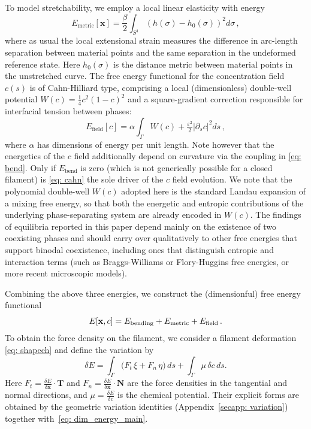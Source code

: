 \documentclass[
aip,
jcp,
reprint, 
floatfix
]{revtex4-1}
\begin{document}
To model stretchability, we employ a local linear elasticity with energy
\begin{equation} \label{eq: E_metric}
E_{\mathrm{metric}}[\mathbf{x}]=\frac{\beta}{2} \int_{S^1}(h(\sigma)-h_0(\sigma))^2 d \sigma\,,
\end{equation}
where as usual the local extensional strain measures the difference in arc-length separation between material points and the same separation in the undeformed reference state. Here $h_0(\sigma)$ is the distance metric between material points in the unstretched curve. 
The free energy functional for the concentration field $c(s)$ is of Cahn-Hilliard type, comprising a local (dimensionless) double-well potential $W(c)=\tfrac{1}{4}c^2(1-c)^2$ and a square-gradient correction responsible for interfacial tension between phases:
\begin{equation}\label{eq: cahn}
    E_{\mathrm{field}}[c]
    = \alpha \int_{\Gamma}
    W(c)
    + \tfrac{\varepsilon^2}{2}|\partial_s c|^2 ds\,,
\end{equation}
where $\alpha$ has dimensions of energy per unit length. Note however that the energetics of the $c$ field additionally depend on curvature via the coupling in \eqref{eq: bend}. Only if $E_{\text{bend}}$ is zero (which is not generically possible for a closed filament) is \eqref{eq: cahn} the sole driver of the $c$ field evolution. We note that the polynomial double-well $W(c)$ adopted here is the standard Landau expansion of a mixing free energy, so that both the energetic and entropic contributions of the underlying phase-separating system are already encoded in $W(c)$. The findings of equilibria reported in this paper depend mainly on the existence of two coexisting phases and should carry over qualitatively to other free energies that support binodal coexistence, including ones that distinguish entropic and interaction terms (such as Braggs-Williams or Flory-Huggins free energies, or more recent microscopic models\cite{Frey2023mechanochemical, PhysRevE.111.044405}).

Combining the above three energies, we construct the (dimensionful) free energy
functional \begin{equation}
E[\mathbf{x},c]
=
E_{\rm bending} + E_{\rm metric} + E_{\rm field} \,.
\label{eq: dim_energy_main}
\end{equation}
To obtain the force density on the filament, we consider a filament deformation \eqref{eq: shapech} and define the variation by
\begin{equation}
\delta E
=
\int_\Gamma \Big(F_{t}\,\xi +F_{n}\,\eta\Big)\,ds
+\int_\Gamma \mu\,\delta c\,ds.
\label{eq:shape_deriv_def}
\end{equation}
Here $F_{t}=\frac{\delta E}{\delta \mathbf{x}} \cdot \mathbf{T}$ and $F_{n}=\frac{\delta E}{\delta \mathbf{x}} \cdot \mathbf{N}$ are the force densities 
in the tangential and normal directions, and $\mu=\frac{\delta E}{\delta c}$ is the chemical potential. Their explicit forms are obtained by the geometric variation identities (Appendix~\ref{secapp: variation}) together with~\eqref{eq: dim_energy_main}.
\end{document}
